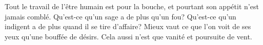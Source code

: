 Tout le travail de l’être humain est pour la bouche,
	et pourtant son appétit n’est jamais comblé.
Qu’est-ce qu’un sage a de plus qu’un fou?
Qu’est-ce qu’un indigent a de plus quand il se tire d’affaire?
Mieux vaut ce que l’on voit de ses yeux qu’une bouffée de désirs.
	Cela aussi n’est que vanité et poursuite de vent.
